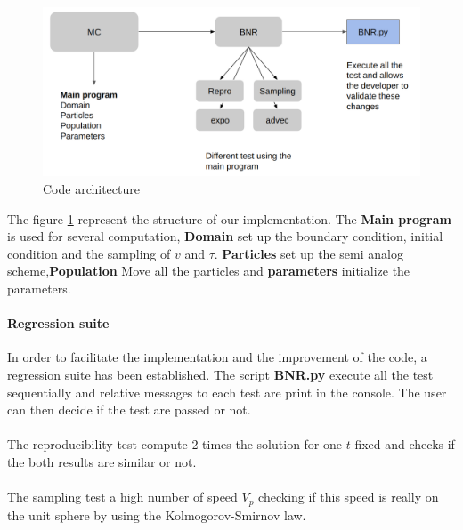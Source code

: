 \documentclass[a4paper, 11pt]{article}
\begin{document}
\begin{figure}[H]
	\centering
	\includegraphics[width=1.0\linewidth]{codestruct.png}
	\caption {Code architecture}
	\label{fig:code}
\end{figure}

The figure \ref{fig:code} represent the structure of our implementation. The \textbf{Main program} is used for several computation, \textbf{Domain} set up the boundary condition, initial condition and the sampling of $v$ and $\tau$. \textbf{Particles} set up the semi analog scheme,\textbf{Population} Move all the particles and \textbf{parameters} initialize the parameters.

\paragraph{Regression suite}

In order to facilitate the implementation and the improvement of the code, a regression suite has been established. The script \textbf{BNR.py} execute all the test sequentially and relative messages to each test are print in the console. The user can then decide if the test are passed or not.

\paragraph{}

The reproducibility test compute 2 times the solution for one $t$ fixed and checks if the both results are similar or not.

\paragraph{}

The sampling test a high number of speed $V_p$ checking if this speed is really on the unit sphere by using the Kolmogorov-Smirnov law.
\end{document}
